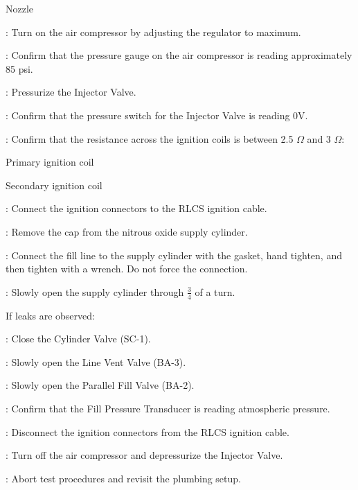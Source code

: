 \begin{checklist}
\begin{checklist}
		\item Nozzle
	\end{checklist}
	\item \primary{}: Turn on the air compressor by adjusting the regulator to maximum. 
	\item \primary{}: Confirm that the pressure gauge on the air compressor is reading approximately 85 psi. 
	\item \primary{}: Pressurize the Injector Valve. 
	\item \daq{}: Confirm that the pressure switch for the Injector Valve is reading 0V.
	\item \secondary{}: Confirm that the resistance across the ignition coils is between 2.5 $\Omega$ and 3 $\Omega$:
	\begin{checklist}
		\item Primary ignition coil
		\item Secondary ignition coil
	\end{checklist}
	\item \secondary{}: Connect the ignition connectors to the RLCS ignition cable.
	\item \primary{}: Remove the cap from the nitrous oxide supply cylinder.
	\item \primary{}: Connect the fill line to the supply cylinder with the gasket, hand tighten, and then tighten with a wrench. Do not force the connection. 
	\item \primary{}: Slowly open the supply cylinder through $\frac{3}{4}$ of a turn. 
	\begin{checklist}[label=$\bullet$]
    		\item If leaks are observed:
    		\begin{checklist}
    			\item \primary{}: Close the Cylinder Valve (SC-1). 
    			\item \primary{}: Slowly open the Line Vent Valve (BA-3). 
    			\item \primary{}: Slowly open the Parallel Fill Valve (BA-2).
    			\item \daq{}: Confirm that the Fill Pressure Transducer is reading atmospheric pressure. 
    			\item \secondary{}: Disconnect the ignition connectors from the RLCS ignition cable. 
    			\item \primary{}: Turn off the air compressor and depressurize the Injector Valve. 
    			\item \ops{}: Abort test procedures and revisit the plumbing setup.

\end{checklist}
\end{checklist}
\end{checklist}
